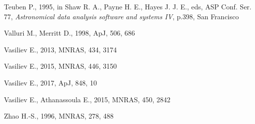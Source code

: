 \documentclass[12pt]{article}
\begin{document}
\begin{thebibliography}{99}
Teuben P., 1995, in Shaw R. A., Payne H. E., Hayes J. J. E., eds, ASP Conf. Ser. 77,
\textsl{Astronomical data analysis software and systems IV}, p.398, San Francisco

Valluri M., Merritt D., 1998, ApJ, 506, 686

Vasiliev E., 2013, MNRAS, 434, 3174

Vasiliev E., 2015, MNRAS, 446, 3150

Vasiliev E., 2017, ApJ, 848, 10

Vasiliev E., Athanassoula E., 2015, MNRAS, 450, 2842

Zhao H.-S., 1996, MNRAS, 278, 488

\end{thebibliography}
\end{document}
